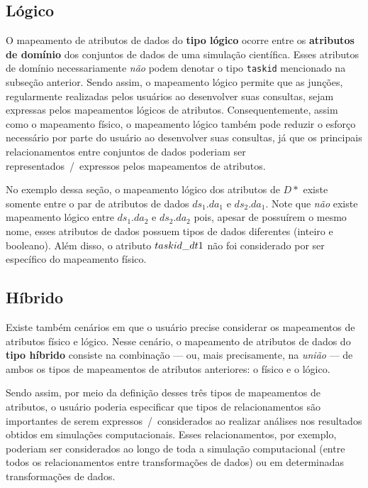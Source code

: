 \subsection{Lógico}

O mapeamento de atributos de dados do \textbf{tipo lógico} ocorre entre os \textbf{atributos de domínio} dos conjuntos de dados de uma simulação científica. Esses atributos de domínio necessariamente \emph{não} podem denotar o tipo \texttt{taskid} mencionado na subseção anterior. Sendo assim, o mapeamento lógico permite que as junções, regularmente realizadas pelos usuários ao desenvolver suas consultas, sejam expressas pelos mapeamentos lógicos de atributos. Consequentemente, assim como o mapeamento físico, o mapeamento lógico também pode reduzir o esforço necessário por parte do usuário ao desenvolver suas consultas, já que os principais relacionamentos entre conjuntos de dados poderiam ser representados~/~expressos pelos mapeamentos de atributos.

No exemplo dessa seção, o mapeamento lógico dos atributos de \(D\ast\) existe somente entre o par de atributos de dados \(ds_1.da_1\) e \(ds_2.da_1\). Note que \emph{não} existe mapeamento lógico entre \(ds_1.da_2\) e \(ds_2.da_2\) pois, apesar de possuírem o mesmo nome, esses atributos de dados possuem tipos de dados diferentes (inteiro e booleano). Além disso, o atributo \(taskid\textup{\_}dt1\) não foi considerado por ser específico do mapeamento físico.

\subsection{Híbrido}

Existe também cenários em que o usuário precise considerar os mapeamentos de atributos físico e lógico. Nesse cenário, o mapeamento de atributos de dados do \textbf{tipo híbrido} consiste na combinação --- ou, mais precisamente, na \emph{união} --- de ambos os tipos de mapeamentos de atributos anteriores: o físico e o lógico. 

Sendo assim, por meio da definição desses três tipos de mapeamentos de atributos, o usuário poderia especificar que tipos de relacionamentos são importantes de serem expressos~/~considerados ao realizar análises nos resultados obtidos em simulações computacionais. Esses relacionamentos, por exemplo, poderiam ser considerados ao longo de toda a simulação computacional (entre todos os relacionamentos entre transformações de dados) ou em determinadas transformações de dados.

